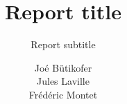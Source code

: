 \documentclass{report}
\title{Report title}
\subtitle{Report subtitle}
\author{
	Joé Bütikofer\\
	Jules Laville\\
	Frédéric Montet
	}
\begin{document}
 
\frontmatter

\maketitle
%
%
%
%
%



\tableofcontents


\setlength{\parskip}{1em}

\mainmatter







\begin{appendices}

\end{appendices}

\backmatter



\end{document}
